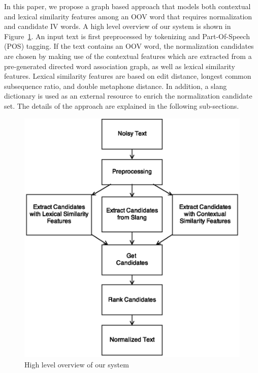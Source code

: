 \documentclass[preprint,review,12pt]{elsarticle}
\begin{document}

In this paper, we propose a graph based approach that models both contextual and lexical similarity features among an OOV word that requires normalization and candidate IV words. A high level overview of our system is shown in Figure~\ref{fig:overview}. An input text is first preprocessed by tokenizing and Part-Of-Speech (POS) tagging. If the text contains an OOV word, the normalization candidates are chosen by making use of the contextual features which are extracted from a pre-generated directed word association graph, as well as lexical similarity features. Lexical similarity features are based on edit distance, longest common subsequence ratio, and double metaphone distance. In addition, a slang dictionary is used as an external resource to enrich the normalization candidate set. The details of the approach are explained in the following sub-sections.

\begin{figure}[htb]
\begin{center}
\includegraphics[scale=0.6]{fig/overview}
\caption{High level overview of our system}
\label{fig:overview}
\end{center}
\end{figure}
\end{document}
